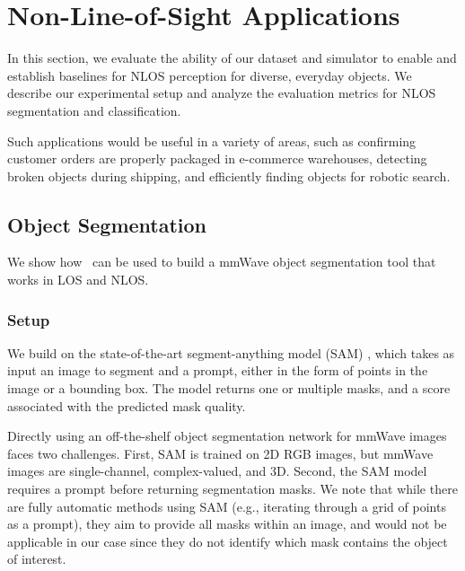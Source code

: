 \vspace{-0.1pt}
\section{Non-Line-of-Sight Applications} 
\label{sec:tasks}





In this section, we evaluate the ability of 
our dataset and simulator
to enable and establish baselines for NLOS perception for diverse, everyday objects. We describe our experimental setup and analyze the evaluation metrics for NLOS segmentation and classification. 

Such applications would be useful in a variety of areas, such as confirming customer orders are properly packaged in e-commerce warehouses, detecting broken objects during shipping, and efficiently finding objects for robotic search.

\vspace{-0.1pt}
\subsection{Object Segmentation}\label{sec:seg}\label{sec:segmentation}
\vspace{-0.1pt}

We show how \name\ can be used to build a mmWave object segmentation tool that works in LOS and NLOS. 

\subsubsection{Setup}

We build on the state-of-the-art segment-anything model (SAM) \cite{sam}, which takes as input an image to segment and a prompt, either in the form of points in the image or a bounding box. The model returns one or multiple masks, and a score associated with the predicted mask quality. 

Directly using an off-the-shelf object segmentation network for mmWave images faces two challenges. First, SAM is trained on 2D RGB images, but mmWave images are single-channel, complex-valued, 
and 3D. Second, the SAM model requires a prompt before returning segmentation masks. We note that while there are fully automatic methods using SAM (e.g., iterating through a grid of points as a prompt)\cite{sam}, they aim to provide all masks within an image, and would not be applicable in our case since they do not identify which mask contains the object of interest.

